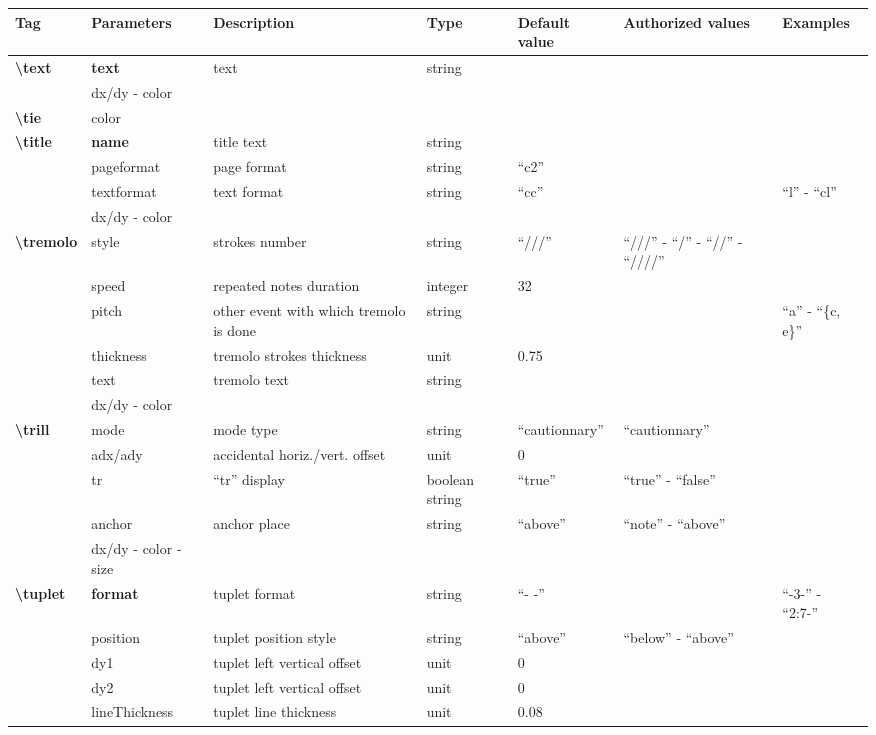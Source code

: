 \documentclass[a4paper, landscape, 10pt]{article}
\begin{document}
\begin{tabularx}{\linewidth}{p{3cm}p{3cm}p{5cm}p{3cm}p{2.5cm}p{3.5cm}p{4cm}}
    \hline
    \textbf{Tag}&\textbf{Parameters}&\textbf{Description}&\textbf{Type}&\textbf{Default value}&\textbf{Authorized values}&\textbf{Examples}\\
    \hline
    \textbf{\textbackslash{}text}&\textbf{text}&text&string&&&\\
    &dx/dy - color&&&&&\\
    \hline
    \textbf{\textbackslash{}tie}&color&&&&&\\
    \hline
    \textbf{\textbackslash{}title}&\textbf{name}&title text&string&&&\\
    &pageformat&page format&string&``c2''&&\\ %
    &textformat&text format&string&``cc''&&``l'' - ``cl''\\ %
    &dx/dy - color&&&&&\\
    \hline
    \textbf{\textbackslash{}tremolo}&style&strokes number&string&``///''&``///'' - ``/'' - ``//'' - ``////''&\\
    &speed&repeated notes duration&integer&32&&\\
    &pitch&other event with which tremolo is done&string&&&``a'' - ``\{c, e\}''\\
    &thickness&tremolo strokes thickness&unit&0.75&&\\
    &text&tremolo text&string&&&\\
    &dx/dy - color&&&&&\\
    \hline
    \textbf{\textbackslash{}trill}&mode&mode type&string&``cautionnary''&``cautionnary''&\\
    &adx/ady&accidental horiz./vert. offset&unit&0&&\\
    &tr&``tr'' display&boolean string&``true''&``true'' - ``false''&\\
    &anchor&anchor place&string&``above''&``note'' - ``above''&\\
    &dx/dy - color - size&&&&&\\
    \hline
    \textbf{\textbackslash{}tuplet}&\textbf{format}&tuplet format&string&``- -''&&``-3-'' - ``2:7-''\\
    &position&tuplet position style&string&``above''&``below'' - ``above''&\\
    &dy1&tuplet left vertical offset&unit&0&&\\
    &dy2&tuplet left vertical offset&unit&0&&\\
    &lineThickness&tuplet line thickness&unit&0.08&&\\

\end{tabularx}
\end{document}
